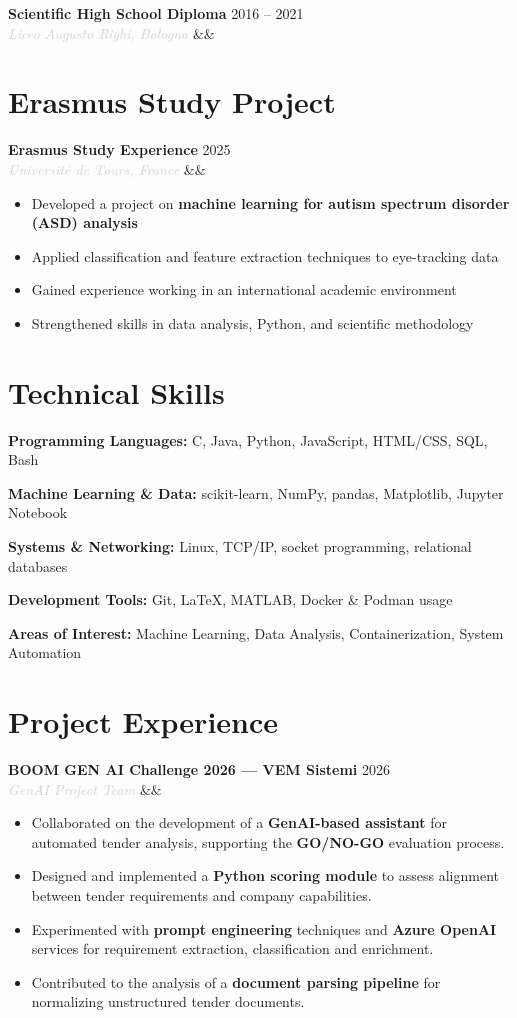 \documentclass[a4paper,10pt]{article}
\newcommand{\entry}[4]{%
  \noindent\textbf{#1} \hfill \textcolor{accent}{#2}\\
  \textit{\textcolor{lightgray}{#3}}%
  \ifx&#4&\else\\\vspace{0.2em}#4\fi
  \vspace{0.5em}
}
\newcommand{\entrylist}[5]{%
  \noindent\textbf{#1} \hfill \textcolor{accent}{#2}\\
  \textit{\textcolor{lightgray}{#3}}%
  \ifx&#4&\else\\\vspace{0.2em}#4\fi
  \vspace{0.3em}
  \begin{itemize}#5\end{itemize}
  \vspace{0.3em}
}
\newcommand{\skillgroup}[2]{%
  \noindent\textbf{#1:} #2\par\vspace{0.35em}
}
\begin{document}
\entry{Scientific High School Diploma}{2016 -- 2021}{Liceo Augusto Righi, Bologna}{}

\section{Erasmus Study Project}

\entrylist{Erasmus Study Experience}{2025}{Université de Tours, France}{}{
  \item Developed a project on \textbf{machine learning for autism spectrum disorder (ASD) analysis}
  \item Applied classification and feature extraction techniques to eye-tracking data
  \item Gained experience working in an international academic environment
  \item Strengthened skills in data analysis, Python, and scientific methodology
}

\section{Technical Skills}

\skillgroup{Programming Languages}{C, Java, Python, JavaScript, HTML/CSS, SQL, Bash}
\skillgroup{Machine Learning \& Data}{scikit-learn, NumPy, pandas, Matplotlib, Jupyter Notebook}
\skillgroup{Systems \& Networking}{Linux, TCP/IP, socket programming, relational databases}
\skillgroup{Development Tools}{Git, \LaTeX, MATLAB, Docker \& Podman usage}
\skillgroup{Areas of Interest}{Machine Learning,
                               Data Analysis,
                               Containerization, System Automation}
\section{Project Experience}

\entrylist{BOOM GEN AI Challenge 2026 — VEM Sistemi}{2026}{GenAI Project Team}{}{
  \item Collaborated on the development of a \textbf{GenAI-based assistant} for automated tender analysis, supporting the \textbf{GO/NO-GO} evaluation process.
  \item Designed and implemented a \textbf{Python scoring module} to assess alignment between tender requirements and company capabilities.
  \item Experimented with \textbf{prompt engineering} techniques and \textbf{Azure OpenAI} services for requirement extraction, classification and enrichment.
  \item Contributed to the analysis of a \textbf{document parsing pipeline} for normalizing unstructured tender documents.
}
\end{document}

